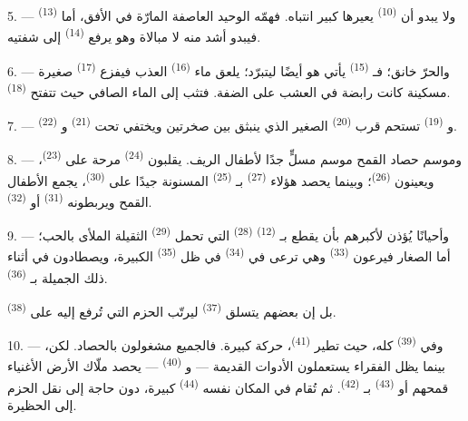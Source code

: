 5. --- ولا يبدو أن  \textsuperscript{(10)} يعيرها كبير
انتباه. فهمّه الوحيد العاصفة المارّة في الأفق، أما 
\textsuperscript{(13)} فيبدو أشد منه لا مبالاة وهو يرفع 
\textsuperscript{(14)} إلى شفتيه.

6. --- والحرّ خانق؛ فـ \textsuperscript{(15)} يأتي هو أيضًا
ليتبرّد؛ يلعق ماء  \textsuperscript{(16)} العذب فيفزع
 \textsuperscript{(17)} صغيرة مسكينة كانت رابضة في العشب على
الضفة. فتثب إلى الماء الصافي حيث تتفتح 
\textsuperscript{(18)}.

7. --- و \textsuperscript{(19)} تستحم قرب 
\textsuperscript{(20)} الصغير الذي ينبثق بين صخرتين ويختفي تحت
 \textsuperscript{(21)} و \textsuperscript{(22)}.

\VUsaut{5.0mm}
\VUsaut{3.4mm}

8. --- وموسم حصاد القمح موسم مسلٍّ جدًا لأطفال الريف. يقلبون
 \textsuperscript{(24)} مرحة على 
\textsuperscript{(23)}، ويعينون  \textsuperscript{(26)}؛ وبينما
يحصد هؤلاء  \textsuperscript{(27)} بـ
\textsuperscript{(25)} المسنونة جيدًا على  \textsuperscript{(30)}،
يجمع الأطفال القمح ويربطونه  \textsuperscript{(31)} أو
 \textsuperscript{(32)}.

9. --- وأحيانًا يُؤذن لأكبرهم بأن يقطع بـ \textsuperscript{(12)}
 \textsuperscript{(28)} التي تحمل 
\textsuperscript{(29)} الثقيلة الملأى بالحب؛ أما الصغار فيرعون
 \textsuperscript{(33)} وهي ترعى في 
\textsuperscript{(34)} في ظل  \textsuperscript{(35)} الكبيرة،
ويصطادون في أثناء ذلك  الجميلة بـ
\textsuperscript{(36)}.

بل إن بعضهم يتسلق  \textsuperscript{(37)} ليرتّب الحزم التي
تُرفع إليه على  \textsuperscript{(38)}.

10. --- وفي  \textsuperscript{(39)} كله، حيث تطير
 \textsuperscript{(41)}، حركة كبيرة. فالجميع مشغولون بالحصاد.
لكن، بينما يظل الفقراء يستعملون الأدوات القديمة ---  و \textsuperscript{(40)} --- يحصد ملّاك الأرض الأغنياء
قمحهم أو  \textsuperscript{(43)} بـ
\textsuperscript{(42)}. ثم تُقام في المكان نفسه  \textsuperscript{(44)}
كبيرة، دون حاجة إلى نقل الحزم إلى الحظيرة.

